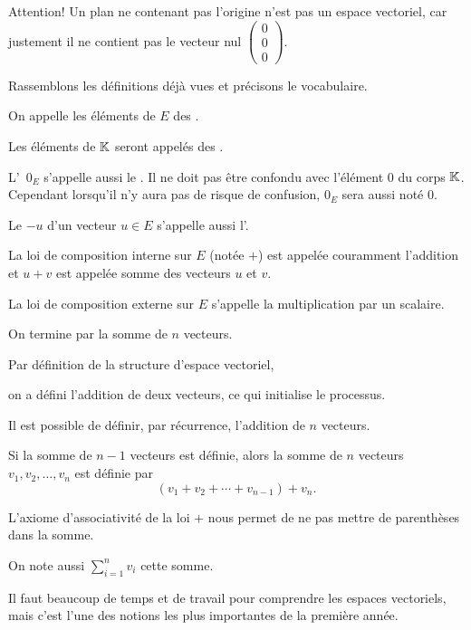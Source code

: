 Attention! Un plan ne contenant pas l'origine n'est pas un espace vectoriel,
car justement il ne contient pas le vecteur nul 
$\left(\begin{smallmatrix}0\\ 0\\ 0\end{smallmatrix}\right)$.



\diapo

Rassemblons les définitions déjà vues et précisons le vocabulaire.
 
On appelle les éléments de $E$ des .

\change
  
Les éléments de $\mathbb{K}$ seront appelés des .

\change

L'\, $0_E$ s'appelle aussi le .
Il ne doit pas être confondu avec l'élément $0$ du corps $\mathbb{K}$. 
Cependant lorsqu'il n'y aura pas de risque de confusion, 
  $0_{E}$ sera aussi noté $0$. 
    
\change

Le  $-u$ d'un vecteur $u \in E$ s'appelle aussi l'.

\change

La loi de composition interne sur $E$ (notée $+$) est appelée couramment 
l'addition et $u+v$ est appelée somme des vecteurs $u$ et $v$. 

\change

La loi de composition externe sur $E$ s'appelle la multiplication par un scalaire. 

\diapo

On termine par la somme de $n$ vecteurs.

\change

Par définition de la structure d'espace vectoriel, 

on a défini l'addition de deux vecteurs, ce qui initialise le processus. 

\change

Il est possible de définir, par récurrence, l'addition de $n$ vecteurs.

Si la somme de $n-1$ vecteurs est définie, alors la somme de $n$ vecteurs 
$v_1,v_2, \ldots, v_n$ est définie par 
$$(v_1+v_2+\cdots+v_{n-1})+v_n.$$  


L'axiome d'associativité de la loi $+$ nous permet de ne pas mettre de
parenthèses dans la somme.  

\change


On note aussi ${\displaystyle \sum_{i=1}^nv_{i}}$ cette somme.

\diapo

Il faut beaucoup de temps et de travail pour comprendre les espaces vectoriels,
mais c'est l'une des notions les plus importantes de la première année.




